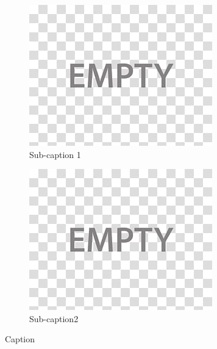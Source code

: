 \documentclass[11pt]{article}
\begin{document}
\begin{figure}[H]
    \centering
    \begin{subfigure}{.49\textwidth}
      \centering
      \includegraphics[width=.95\linewidth]{gfx/Thumbnail.jpg}
      \caption{Sub-caption 1}
      \label{fig:thumbnail2}
    \end{subfigure}
    \begin{subfigure}{.49\textwidth}
      \centering
      \includegraphics[width=.95\linewidth]{gfx/Thumbnail.jpg}
      \caption{Sub-caption2}
      \label{fig:thumbnail3}
    \end{subfigure}
    \caption{Caption}
\end{figure}
\end{document}
